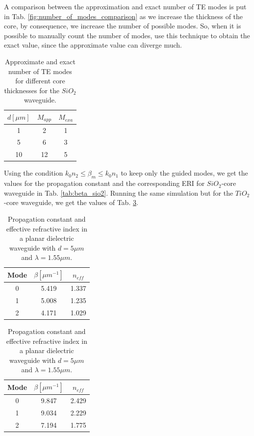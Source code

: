 \documentclass[a4paper,12pt]{article}
\begin{document}
A comparison between the approximation and exact number of TE modes is put in Tab. \ref{fig:number_of_modes_comparison} as we increase the thickness of the core, by consequence, we increase the number of possible modes. So, when it is possible to manually count the number of modes, use this technique to obtain the exact value, since the approximate value can diverge much.

\begin{table}[H]
    \centering
    \begin{tabular}{ccc}
        \toprule
        $d [\mu m]$ & $M_{app}$ & $M_{exa}$ \\
        \midrule
        1 & 2 & 1 \\
        5 & 6 & 3 \\
        10 & 12 & 5 \\
        \bottomrule
    \end{tabular}
    \caption{Approximate and exact number of TE modes for different core thicknesses for the $SiO_2$ waveguide.}
    \label{tab:number_of_modes_comparison}
\end{table}

Using the condition $k_0 n_2 \leq \beta_m \leq k_0 n_1$ to keep only the guided modes, we get the values for the propagation constant and the corresponding ERI for $SiO_2$-core waveguide in Tab. \ref{tab:beta_sio2}. Running the same simulation but for the $TiO_2$-core waveguide, we get the values of Tab. \ref{tab:beta_tio2}.

\begin{table}[H]
    \centering
    \begin{subtable}{0.45\textwidth}
        \centering
        \begin{tabular}{ccc}
            \toprule
            Mode & $\beta [\mu m^{-1}]$ & $n_{eff}$ \\
            \midrule
            0 & 5.419 & 1.337 \\
            1 & 5.008 & 1.235 \\
            2 & 4.171 & 1.029 \\
            \bottomrule
        \end{tabular}
        \caption{$SiO_2$.}
        \label{tab:beta_sio2}
    \end{subtable}
    \hfill
    \begin{subtable}{0.45\textwidth}
        \centering
        \begin{tabular}{ccc}
            \toprule
            Mode & $\beta [\mu m^{-1}]$ & $n_{eff}$ \\
            \midrule
            0 & 9.847 & 2.429 \\
            1 & 9.034 & 2.229 \\
            2 & 7.194 & 1.775 \\
            \bottomrule
        \end{tabular}
        \caption{$TiO_2$.}
        \label{tab:beta_tio2}
    \end{subtable}
    \caption{Propagation constant and effective refractive index in a planar dielectric waveguide with $d = 5 \mu m$ and $\lambda = 1.55 \mu m$.}
\end{table}
\end{document}
